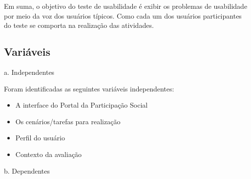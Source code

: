 Em suma, o objetivo do teste de usabilidade é exibir os problemas de usabilidade por meio da voz dos usuários típicos. Como cada um dos usuários participantes do teste se comporta na realização das atividades.


\subsection{Variáveis}
 
a. Independentes

Foram identificadas as seguintes variáveis independentes: 

\begin{itemize}
	\item A interface do Portal da Participação Social
	\item Os cenários/tarefas para realização
	\item Perfil do usuário
	\item Contexto da avaliação
\end{itemize}

b. Dependentes


